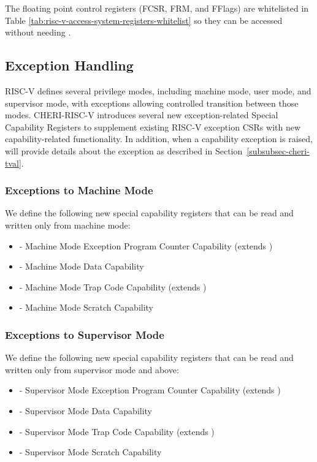 The floating point control
registers (FCSR, FRM, and FFlags) are whitelisted in Table \ref{tab:risc-v-access-system-registers-whitelist}
so they can be accessed without needing \cappermASR{}.

\subsection{Exception Handling}
\label{subsection:riscv:exceptionhandling}
RISC-V defines several privilege modes, including machine mode, user mode, and
supervisor mode, with exceptions allowing controlled transition between those modes.
CHERI-RISC-V introduces several new exception-related Special Capability Registers
to supplement existing RISC-V exception CSRs with new capability-related functionality.
In addition, when a capability exception is raised, \xtval{} will provide
details about the exception as described in Section~\ref{subsubsec-cheri-tval}.

\subsubsection{Exceptions to Machine Mode}
We define the following new special capability registers that can be read and
written only from machine mode:

\begin{itemize}
\item \MEPCC{} - Machine Mode Exception Program Counter Capability (extends
  \mepc{})
\item \MTDC{} - Machine Mode Data Capability
\item \MTCC{} - Machine Mode Trap Code Capability (extends \mtvec{})
\item \MScratchC{} - Machine Mode Scratch Capability
\end{itemize}

\subsubsection{Exceptions to Supervisor Mode}

We define the following new special capability registers that can be read and
written only from supervisor mode and above:

\begin{itemize}
\item \SEPCC{} - Supervisor Mode Exception Program Counter Capability (extends
  \sepc{})
\item \STDC{} - Supervisor Mode Data Capability
\item \STCC{} - Supervisor Mode Trap Code Capability (extends
  \stvec{})
\item \SScratchC{} - Supervisor Mode Scratch Capability
\end{itemize}

